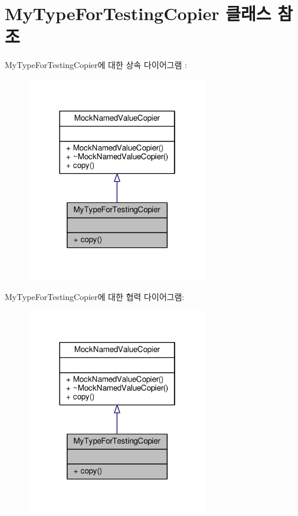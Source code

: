\hypertarget{class_my_type_for_testing_copier}{}\section{My\+Type\+For\+Testing\+Copier 클래스 참조}
\label{class_my_type_for_testing_copier}


My\+Type\+For\+Testing\+Copier에 대한 상속 다이어그램 \+: 
\nopagebreak
\begin{figure}[H]
\begin{center}
\leavevmode
\includegraphics[width=226pt]{class_my_type_for_testing_copier__inherit__graph}
\end{center}
\end{figure}


My\+Type\+For\+Testing\+Copier에 대한 협력 다이어그램\+:
\nopagebreak
\begin{figure}[H]
\begin{center}
\leavevmode
\includegraphics[width=226pt]{class_my_type_for_testing_copier__coll__graph}
\end{center}
\end{figure}
